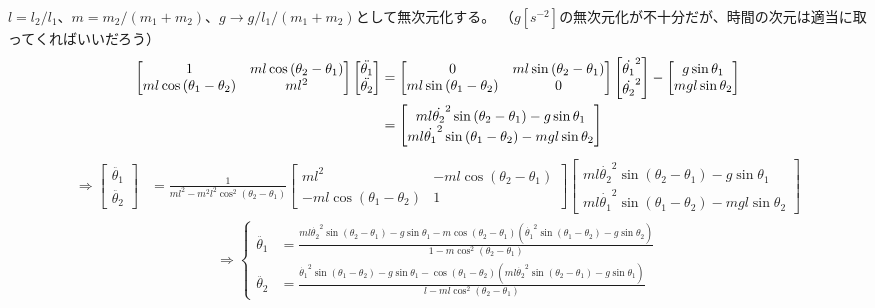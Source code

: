 \documentclass{jsarticle}
\newcommand{\eqa}[1]{\begin{align}#1\end{align}}
\newcommand{\so}{\Rightarrow}
\newcommand{\cost}[2]{\cos\left(\theta_{#1}-\theta_{#2}\right)}
\newcommand{\coste}[3]{\cos^{#3}\left(\theta_{#1}-\theta_{#2}\right)}
\newcommand{\sint}[2]{\sin\left(\theta_{#1}-\theta_{#2}\right)}
\newcommand{\dott}[1]{\dot{\theta_{#1}}}
\newcommand{\ddott}[1]{\ddot{\theta_{#1}}}
\begin{document}
$l = l_2 / l_1$、$m = m_2 / (m_1 + m_2)$、$g \rightarrow g / l_1 / (m_1 + m_2)$として無次元化する。
（$g[s^{-2}]$の無次元化が不十分だが、時間の次元は適当に取ってくればいいだろう）
\eqa{
	\begin{bmatrix}
		1 & m l \cost{2}{1} \\
		m l \cost{1}{2} & m l^2
	\end{bmatrix}
	\begin{bmatrix}
		\ddott{1} \\ \ddott{2}
	\end{bmatrix}
	&=
	\begin{bmatrix}
		0 & m l \sint{2}{1} \\
		m l \sint{1}{2} & 0
	\end{bmatrix}
	\begin{bmatrix}
		\dott{1}^2 \\ \dott{2}^2
	\end{bmatrix}
	-
	\begin{bmatrix}
		g \sin\theta_1 \\ m g l \sin\theta_2
	\end{bmatrix} \notag\\
	&=
	\begin{bmatrix}
		m l \dott{2}^2 \sint{2}{1} - g \sin\theta_1 \\
		m l \dott{1}^2 \sint{1}{2} - m g l \sin\theta_2
	\end{bmatrix} \notag
}
\eqa{
	\so
	\begin{bmatrix}
		\ddott{1} \\ \ddott{2}
	\end{bmatrix}
	&=
	\frac{1}{m l^2 - m^2 l^2 \coste{2}{1}{2}}
	\begin{bmatrix}
		m l^2 & -m l \cost{2}{1} \\
		-m l \cost{1}{2} & 1
	\end{bmatrix}
	\begin{bmatrix}
		m l \dott{2}^2 \sint{2}{1} - g \sin\theta_1 \\
		m l \dott{1}^2 \sint{1}{2} - m g l \sin\theta_2
	\end{bmatrix}
}
\eqa{
	\so
	\begin{cases}
		\ddott{1} &= \frac{m l \dott{2}^2 \sint{2}{1} - g \sin\theta_1 - m \cost{2}{1}\left(\dott{1}^2 \sint{1}{2} - g \sin\theta_2\right)}{1 - m \coste{2}{1}{2}} \\
		\ddott{2} &= \frac{\dott{1}^2 \sint{1}{2} - g \sin\theta_1 - \cost{1}{2}\left(m l \dott{2}^2 \sint{2}{1} - g \sin\theta_1\right)}{l - m l \coste{2}{1}{2}}
	\end{cases}
}
\end{document}
